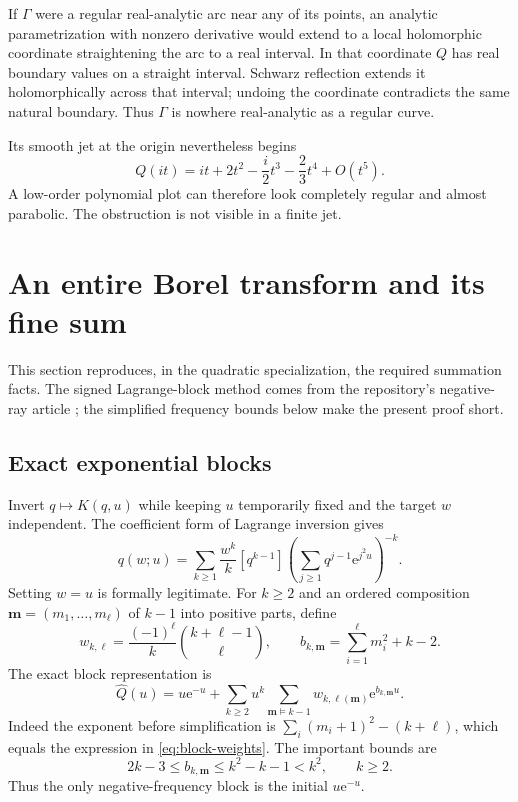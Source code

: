 \documentclass[11pt,a4paper]{article}
\numberwithin{equation}{section}
\theoremstyle{definition}
\theoremstyle{remark}
\newcommand{\ee}{\mathrm e}
\newcommand{\Q}{\widehat Q}
\newcommand{\coef}[2]{[#1^{#2}]}
\begin{document}
If $\Gamma$ were a regular real-analytic arc near any of its points,
an analytic parametrization with nonzero derivative would extend to a
local holomorphic coordinate straightening the arc to a real interval.
In that coordinate $Q$ has real boundary values on a straight interval.
Schwarz reflection extends it holomorphically across that interval;
undoing the coordinate contradicts the same natural boundary.
Thus $\Gamma$ is nowhere real-analytic as a regular curve.

Its smooth jet at the origin nevertheless begins
\begin{equation}
 Q(it)=it+2t^2-\frac{i}{2}t^3-\frac23t^4+O(t^5).
 \label{eq:boundary-jet}
\end{equation}
A low-order polynomial plot can therefore look completely regular and
almost parabolic.  The obstruction is not visible in a finite jet.

\section{An entire Borel transform and its fine sum}
\label{sec:borel}

This section reproduces, in the quadratic specialization, the required
summation facts.  The signed Lagrange-block method comes from the
repository's negative-ray article \cite{repo-negative}; the simplified
frequency bounds below make the present proof short.

\subsection{Exact exponential blocks}
Invert $q\mapsto K(q,u)$ while keeping $u$ temporarily fixed and the
target $w$ independent.  The coefficient form of Lagrange inversion
\cite{gessel} gives
\[
 q(w;u)=\sum_{k\ge1}\frac{w^k}{k}
        \coef{q}{k-1}\left(\sum_{j\ge1}q^{j-1}\ee^{j^2u}\right)^{-k}.
\]
Setting $w=u$ is formally legitimate.  For $k\ge2$ and an ordered
composition $\mathbf m=(m_1,\ldots,m_\ell)$ of $k-1$ into positive
parts, define
\begin{equation}
 w_{k,\ell}=\frac{(-1)^\ell}{k}\binom{k+\ell-1}{\ell},\qquad
 b_{k,\mathbf m}=\sum_{i=1}^{\ell}m_i^2+k-2.
 \label{eq:block-weights}
\end{equation}
The exact block representation is
\begin{equation}
 \Q(u)=u\ee^{-u}
       +\sum_{k\ge2}u^k
          \sum_{\mathbf m\vDash k-1}
                    w_{k,\ell(\mathbf m)}\ee^{b_{k,\mathbf m}u}.
 \label{eq:quadratic-blocks}
\end{equation}
Indeed the exponent before simplification is
$\sum_i(m_i+1)^2-(k+\ell)$, which equals the expression in
\eqref{eq:block-weights}.  The important bounds are
\begin{equation}
 2k-3\le b_{k,\mathbf m}\le k^2-k-1<k^2,
 \qquad k\ge2.
 \label{eq:frequency-range}
\end{equation}
Thus the only negative-frequency block is the initial $u\ee^{-u}$.
\end{document}

